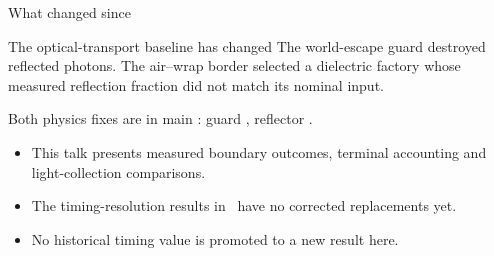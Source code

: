 \begin{frame}
\titlepage
\end{frame}

\begin{frame}{What changed since \DeckOld}
\begin{block}{The optical-transport baseline has changed}
The world-escape guard destroyed reflected photons. The air--wrap border selected a dielectric factory whose measured reflection fraction did not match its nominal input.
\end{block}
Both physics fixes are in main \texttt{\MainSha}: guard \texttt{\GuardSha}, reflector \texttt{\ReflectorSha}.
\vspace{\Gap}
\begin{itemize}
\item This talk presents measured boundary outcomes, terminal accounting and light-collection comparisons.
\item The timing-resolution results in \DeckOld\ have no corrected replacements yet.
\item No historical timing value is promoted to a new result here.
\end{itemize}
\end{frame}
